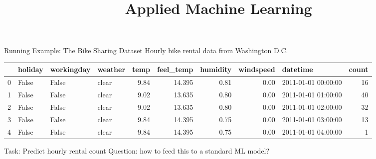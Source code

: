 \documentclass[11pt,compress,t,notes=noshow, xcolor=table]{beamer}
\title{Applied Machine Learning}
\date{}
\begin{document}


\begin{vbframe}{Running Example: The Bike Sharing Dataset}
\vfill
Hourly bike rental data from Washington D.C.
\vfill
\small %
\begin{tabular}{llllrrrrlr}
\toprule
 & holiday & workingday & weather & temp & feel\_temp & humidity & windspeed & datetime & count \\
\midrule
0 & False & False & clear & 9.84 & 14.395 & 0.81 & 0.00 & 2011-01-01 00:00:00 & 16 \\
1 & False & False & clear & 9.02 & 13.635 & 0.80 & 0.00 & 2011-01-01 01:00:00 & 40 \\
2 & False & False & clear & 9.02 & 13.635 & 0.80 & 0.00 & 2011-01-01 02:00:00 & 32 \\
3 & False & False & clear & 9.84 & 14.395 & 0.75 & 0.00 & 2011-01-01 03:00:00 & 13 \\
4 & False & False & clear & 9.84 & 14.395 & 0.75 & 0.00 & 2011-01-01 04:00:00 & 1 \\
\bottomrule
\end{tabular}
\vfill
\pause
Task: Predict hourly rental count
\pause
Question: how to feed this to a standard ML model?
\vfill
\end{vbframe}
\end{document}
